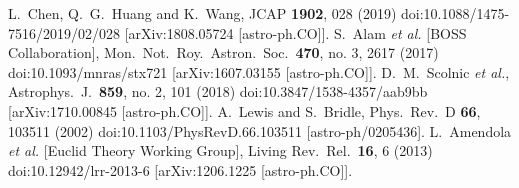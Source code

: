 \documentclass[aps,prd,amsmath,amssymb,showpacs,floats,floatfix,nofootinbib,reprint]{revtex4-1}
\begin{document}
\begin{thebibliography}{99}
  L.~Chen, Q.~G.~Huang and K.~Wang,
  JCAP {\bf 1902}, 028 (2019)
  doi:10.1088/1475-7516/2019/02/028
  [arXiv:1808.05724 [astro-ph.CO]].
  S.~Alam {\it et al.} [BOSS Collaboration],
  Mon.\ Not.\ Roy.\ Astron.\ Soc.\  {\bf 470}, no. 3, 2617 (2017)
  doi:10.1093/mnras/stx721
  [arXiv:1607.03155 [astro-ph.CO]].
  D.~M.~Scolnic {\it et al.},
  Astrophys.\ J.\  {\bf 859}, no. 2, 101 (2018)
  doi:10.3847/1538-4357/aab9bb
  [arXiv:1710.00845 [astro-ph.CO]].
  A.~Lewis and S.~Bridle,
  Phys.\ Rev.\ D {\bf 66}, 103511 (2002)
  doi:10.1103/PhysRevD.66.103511
  [astro-ph/0205436].
  L.~Amendola {\it et al.} [Euclid Theory Working Group],
  Living Rev.\ Rel.\  {\bf 16}, 6 (2013)
  doi:10.12942/lrr-2013-6
  [arXiv:1206.1225 [astro-ph.CO]].



\end{thebibliography}
\end{document}

